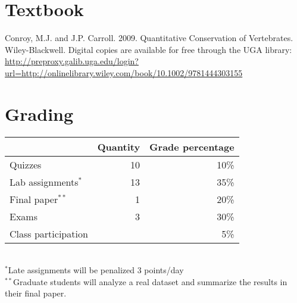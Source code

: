 \documentclass[12pt]{article}
\begin{document}
\vspace{-2mm}
\section*{\normalsize Textbook}
\vspace{-4mm}
Conroy, M.J. and J.P. Carroll. 2009. Quantitative Conservation of
Vertebrates. Wiley-Blackwell.
Digital copies are available for free through the UGA library:
{\footnotesize \url{http://preproxy.galib.uga.edu/login?url=http://onlinelibrary.wiley.com/book/10.1002/9781444303155}}

\vspace{-2mm}
\section*{\normalsize Grading}
\vspace{-4mm}
\begin{center}
  \begin{tabular}[h!]{lrr}
    \hline
                              & Quantity & Grade percentage      \\
    \hline
    Quizzes                   & 10       & 10\%                  \\
    Lab assignments$^*$       & 13       & 35\%                  \\
    Final paper$^{**}$         & 1        & 20\%                  \\
    Exams                     & 3        & 30\%                  \\
    Class participation       &          & 5\%                   \\
    \hline
  \end{tabular}                                                  \\
  \small
\hspace{0mm} $^*$Late assignments will be penalized 3 points/day \\ %
\hspace{0mm} $^{**}$Graduate students will analyze a real dataset and
summarize the results in their final paper.
\end{center}



\vspace{-2mm}
\end{document}
